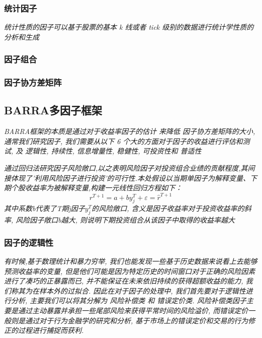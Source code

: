 \documentclass{scrartcl}
\numberwithin{equation}{section}   %
\begin{document}
\subsubsection{统计因子}

\textsl{统计性质的因子可以基于股票的基本 k 线或者 tick 级别的数据进行统计学性质的分析和生成
}
\subsubsection{因子组合}
\subsubsection{因子协方差矩阵}


\subsection{BARRA多因子框架}



\textsl{BARRA框架的本质是通过对于收益率因子的估计 来降低 因子协方差矩阵的大小, 通常我们研究因子, 我们需要从以下 6 个大的方面对于因子的收益进行评估和测试, 及 逻辑性, 持续性, 信息增量性, 稳健性, 可投资性和 普适性}

\textsl{通过回归法研究因子风险敞口,以之表明风险因子对投资组合业绩的贡献程度,其间接体现了'利用风险因子进行投资'的可行性.本处假设以当期单因子为解释变量、下期个股收益率为被解释变量,构建一元线性回归方程如下：}
$$ r^{T+1} = a + b y^{T}_j + \varepsilon = \hat{r}^{T+1} $$
\textsl{其中系数b代表了T期j因子$y^{T}_j$的风险敞口, 含义是因子收益率对于投资收益率的斜率, 风险因子敞口b越大, 则说明下期投资组合从该因子中取得的收益率越大
}
\subsubsection{因子的逻辑性}
\textsl{
    有时候,基于数理统计和暴力穷举, 我们也能发现一些基于历史数据来说看上去能够预测收益率的变量, 但是他们可能是因为特定历史的时间窗口对于正确的风险因素进行了凑巧的正暴露而已, 并不能保证在未来依旧持续的获得超额收益的能力, 我们称其为在样本外的过拟合. 因此在对于因子的处理中, 我们首先要对于逻辑性进行分析, 主要我们可以将其分解为 风险补偿类 和 错误定价类.  风险补偿类因子主要是通过主动暴露并承担一些尾部风险来获得平常时间的风险溢价, 而错误定价一般则是通过对于行为金融学的研究和分析, 基于市场上的错误定价和交易的行为修正的过程进行捕捉而获利. 
}
\end{document}
